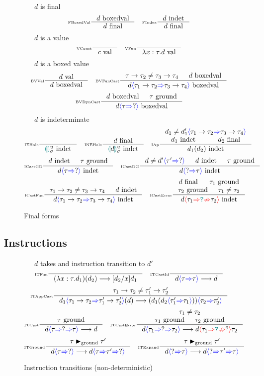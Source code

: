 \begin{figure}[H]
\fbox{$\final$}\ \ \ $d$ is final
\[\inference[\tiny FBoxedVal]{\boxedval}{\final}\quad
\inference[\tiny FIndex]{\indet}{\final}\]
\fbox{$\val$}\ \ \ $d$ is a value
\[\inference[\tiny VConst]{}{\val[c]}\quad
\inference[\tiny VFun]{}{\val[\lambda x:\tau. d]}\]
\fbox{$\boxedval$}\ \ \ $d$ is a boxed value
\[\inference[\tiny BVVal]{\val}{\boxedval}\quad
\inference[\tiny BVFunCast]{\tau \to \tau_2 \neq \tau_3 \to \tau_4 & \boxedval}{\boxedval[d\scast{\tau_1 \to \tau_2}{\tau_3 \to \tau_4}]}\]
\[\inference[\tiny BVDynCast]{\boxedval & \ground}{\boxedval[d\scast{\tau}{?}]}\]
\fbox{$\indet$}\ \ \ $d$ is indeterminate
\[\inference[\tiny IEHole]{}{\indet[\hole^u_\sigma]}\quad
\inference[\tiny INEHole]{\final}{\indet[{\hole[d]^u_\sigma}]}\quad
\inference[\tiny IAp]{d_1 \neq d_1'\scast{\tau_1 \to \tau_2}{\tau_3 \to \tau_4} \\ \indet[d_1] & \final[d_2]}{\indet[d_1(d_2)]}\]
\[\inference[\tiny ICastGD]{\indet & \ground}{\indet[d\scast{\tau}{?}]}\quad
\inference[\tiny ICastDG]{d \neq d'\scast{\tau'}{?} & \indet & \ground}{\indet[d\scast{?}{\tau}]}\]
\[\inference[\tiny ICastFun]{\tau_1 \to \tau_2 \neq \tau_3 \to \tau_4 & \indet}{\indet[d\scast{\tau_1 \to \tau_2}{\tau_3 \to \tau_4}]}\quad
\inference[\tiny ICastError]{\final & \ground[\tau_1] \\ \ground[\tau_2] & \tau_1 \neq \tau_2}{\indet[d\scasterror{\tau_1}{\tau_2}]}\]

\caption{Final forms}
\label{fig:finalforms}
\end{figure}

\subsection{Instructions}
\begin{figure}[H]
\ \ \ $d$ takes and instruction transition to $d'$
\[\inference[\tiny ITFun]{}{(\lambda x:\tau. d_1)(d_2) \longrightarrow [d_2/x]d_1}\quad
\inference[\tiny ITCastId]{}{d\scast{\tau}{\tau} \longrightarrow d}\]
\[\inference[\tiny ITAppCast]{\tau_1 \to \tau_2 \neq \tau_1' \to \tau_2'}{d_1\scast{\tau_1 \to \tau_2}{\tau_1' \to \tau_2'}(d) \longrightarrow (d_1(d_2\scast{\tau_1'}{\tau_1}))\scast{\tau_2}{\tau_2'}}\]
\[\inference[\tiny ITCast]{\ground}{d\scastcast{\tau}{?}{\tau} \longrightarrow d} \quad
\inference[\tiny ITCastError]{\tau_1 \neq \tau_2 \\ \ground[\tau_1] & \ground[\tau_2]}{d\scastcast{\tau_1}{?}{\tau_2}\longrightarrow d\scasterror{\tau_1}{?}{\tau_2}}\]
\[\inference[\tiny ITGround]{\tau \groundmatch \tau'}{d\scast{\tau}{?} \longrightarrow d\scastcast{\tau}{\tau'}{?}}\quad
\inference[\tiny ITExpand]{\tau \groundmatch \tau'}{d\scast{?}{\tau} \longrightarrow d\scastcast{?}{\tau'}{\tau}}\]
\caption{Instruction transitions (non-deterministic)}
\label{fig:instructions}
\end{figure}

